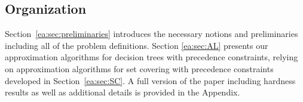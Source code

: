



% 
%
% 

% 

\subsection{Organization}
Section~\ref{ea:sec:preliminaries} introduces the necessary notions and preliminaries including all of the problem definitions. Section \ref{ea:sec:AL} presents our approximation algorithms for decision trees with precedence constraints, relying on approximation algorithms for set covering with precedence constraints developed in Section~\ref{ea:sec:SC}. A full version of the paper including hardness results as well as additional details is provided in the Appendix.

